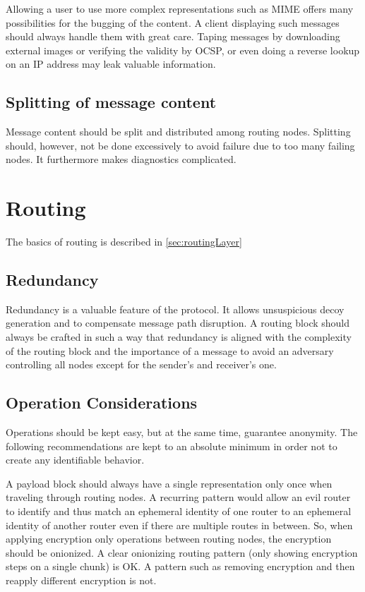 Allowing a user to use more complex representations such as MIME offers many possibilities for the bugging of the content. A client displaying such messages should always handle them with great care. Taping messages by downloading external images or verifying the validity by OCSP, or even doing a reverse lookup on an IP address may leak valuable information.

\subsection{Splitting of message content}
Message content should be split and distributed among routing nodes. Splitting should, however, not be done excessively to avoid failure due to too many failing nodes. It furthermore makes diagnostics complicated. 

\section{Routing}
The basics of routing is described in \cref{sec:routingLayer}
\subsection{Redundancy}
Redundancy is a valuable feature of the protocol. It allows unsuspicious decoy generation and to compensate message path disruption. A routing block should always be crafted in such a way that redundancy is aligned with the complexity of the routing block and the importance of a message to avoid an adversary controlling all nodes except for the sender's and receiver's one.

\subsection{Operation Considerations}
Operations should be kept easy, but at the same time, guarantee anonymity. The following recommendations are kept to an absolute minimum in order not to create any identifiable behavior.

A payload block should always have a single representation only once when traveling through routing nodes. A recurring pattern would allow an evil router to identify and thus match an ephemeral identity of one router to an ephemeral identity of another router even if there are multiple routes in between. So, when applying encryption only operations between routing nodes, the encryption should be onionized. A clear onionizing routing pattern (only showing encryption steps on a single chunk) is OK. A pattern such as removing encryption and then reapply different encryption is not.

